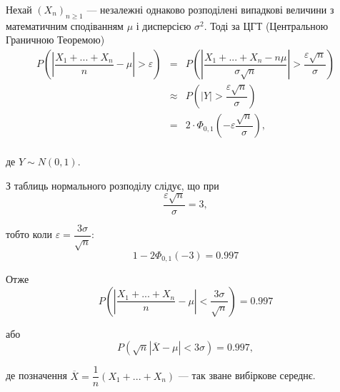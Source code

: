 \begin{example}
    Нехай $(X_n)_{n \geqslant 1}$ --- незалежні однаково розподілені
    випадкові величини з математичним сподіванням $\mu$
    і дисперсією $\sigma^2$. Тоді за ЦГТ (Центральною Граничною
    Теоремою)
    $$\begin{array}{rcl}
        P\left(\left|\dfrac{X_1 + ... + X_n}{n} - \mu\right| > \varepsilon \right)
        & = & P\left(\left|\dfrac{X_1 + ... + X_n - n\mu}{\sigma\sqrt{n}}\right|
            > \dfrac{\varepsilon \sqrt{n}}{\sigma} \right) \\
        & \approx & P\left(\left|Y\right| > \dfrac{\varepsilon \sqrt{n}}{\sigma} \right) \\
        & = & 2 \cdot \Phi_{0, 1}\left(- \varepsilon \dfrac{\sqrt{n}}{\sigma} \right), \\
    \end{array}$$
    
    де $Y \sim N(0, 1)$.
    
    З таблиць нормального розподілу слідує, що при
    $$\dfrac{\varepsilon \sqrt{n}}{\sigma} = 3,$$
    
    тобто коли $\varepsilon = \dfrac{3 \sigma}{\sqrt{n}}$:
    $$1 - 2 \Phi_{0, 1}(-3) = 0.997$$
    
    Отже 
    $$P\left(\left|\dfrac{X_1 + ... + X_n}{n} - \mu\right| < \dfrac{3 \sigma}{\sqrt{n}} \right) = 0.997$$
    
    або
    $$P(\sqrt{n} |\overline{X} - \mu| < 3 \sigma) = 0.997,$$
    
    де позначення $\overline{X} = \dfrac{1}{n}(X_1 + ... + X_n)$ --- так
    зване вибіркове середнє.
\end{example}


